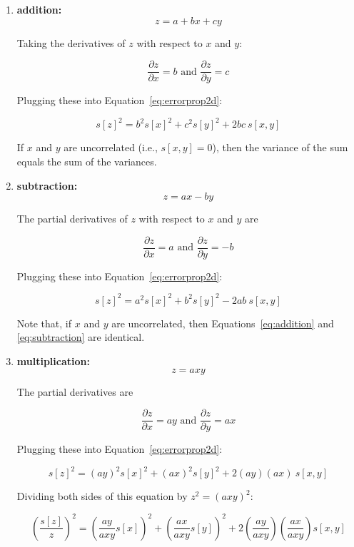 \begin{enumerate}
  
\item{\bf addition:}
  \[
  z = a + b x + c y
  \]

  Taking the derivatives of $z$ with respect to $x$ and $y$:
  
  \[
  \frac{\partial z}{\partial x} = b \mbox{~and~} \frac{\partial z}{\partial y} = c
  \]

  Plugging these into Equation~\ref{eq:errorprop2d}:

  \begin{equation}
    s[z]^2 = b^2 s[x]^2 + c^2 s[y]^2 + 2bc~s[x,y]
    \label{eq:addition}
  \end{equation}

  If $x$ and $y$ are uncorrelated (i.e., $s[x,y]=0$), then the
  variance of the sum equals the sum of the variances.

\item{\bf subtraction:}
  \[
  z = a x - b y
  \]

  The partial derivatives of $z$ with respect to $x$ and $y$ are

  \[
  \frac{\partial z}{\partial x} = a \mbox{~and~}
  \frac{\partial z}{\partial y} = -b
  \]

  Plugging these into Equation~\ref{eq:errorprop2d}:
  
  \begin{equation}
    s[z]^2 = a^2 s[x]^2 + b^2 s[y]^2 - 2ab~s[x,y]
    \label{eq:subtraction}
  \end{equation}

  Note that, if $x$ and $y$ are uncorrelated, then
  Equations~\ref{eq:addition} and \ref{eq:subtraction} are identical.

\item{\bf multiplication:}
  \[
  z = a x y
  \]

  The partial derivatives are

  \[
  \frac{\partial z}{\partial x} = a y \mbox{~and~}
  \frac{\partial z}{\partial y} = a x
  \]

  Plugging these into Equation~\ref{eq:errorprop2d}:

  \[
  s[z]^2 = (a y)^2 s[x]^2 + (a x)^2 s[y]^2 + 2(a y)(a x)~s[x,y]
  \]

  Dividing both sides of this equation by $z^2 = (a x y)^2$:
  
  \[
  \left(\frac{s[z]}{z}\right)^2 =
  \left(\frac{a y}{a x y} s[x]\right)^2 +
  \left(\frac{a x}{a x y} s[y]\right)^2 +
  2\left(\frac{a y}{a x y}\right)\left(\frac{a x}{a x y}\right) s[x,y]
  \]


\end{enumerate}
